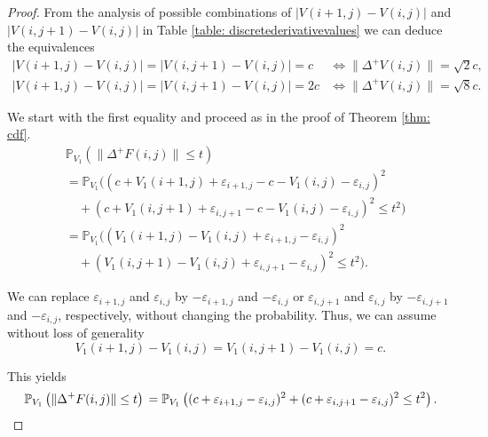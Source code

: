 \documentclass[a4paper,12pt]{article}
\newcommand{\abs}[1]{\lvert#1\rvert}
\newcommand{\norm}[1]{\lVert#1\rVert}
\theoremstyle{plain}
\theoremstyle{definition}
\numberwithin{equation}{section}
\begin{document}
\begin{proof}
	From the analysis of possible combinations of $\abs{V(i + 1, j) - V(i, j)}$ and $\abs{V(i, j + 1) - V(i, j)}$ in Table \ref{table: discretederivativevalues} we can deduce the equivalences
	\begin{align*}
		\abs{V(i + 1, j) - V(i, j)} = \abs{V(i, j + 1) - V(i, j)} = c &\Leftrightarrow \norm{\Delta^+ V(i, j)} = \sqrt{2} c, \\
		\abs{V(i + 1, j) - V(i, j)} = \abs{V(i, j + 1) - V(i, j)} = 2 c &\Leftrightarrow \norm{\Delta^+ V(i, j)} = \sqrt{8} c.
	\end{align*}
	
	We start with the first equality and proceed as in the proof of Theorem \ref{thm: cdf}.
	\begin{align*}
		&\mathbb{P}_{V_1}\left( \norm{\Delta^+ F(i, j)} \leq t \right) \\
		&= \mathbb{P}_{V_1}\big( (c + V_1(i + 1, j) + \varepsilon_{i + 1, j} - c - V_1(i, j) - \varepsilon_{i, j})^2 \\
		&\quad + (c + V_1(i, j + 1) + \varepsilon_{i, j + 1} - c - V_1(i, j) - \varepsilon_{i, j})^2 \leq t^2 \big) \\
		&= \mathbb{P}_{V_1}\big( (V_1(i + 1, j) - V_1(i, j) + \varepsilon_{i + 1, j} - \varepsilon_{i, j})^2 \\
		&\quad + (V_1(i, j + 1) - V_1(i, j) + \varepsilon_{i, j + 1} - \varepsilon_{i, j})^2 \leq t^2 \big).
	\end{align*}
	
	We can replace $\varepsilon_{i + 1, j}$ and $\varepsilon_{i, j}$ by $- \varepsilon_{i + 1, j}$ and $- \varepsilon_{i, j}$ or $\varepsilon_{i, j + 1}$ and $\varepsilon_{i, j}$ by $- \varepsilon_{i, j + 1}$ and $- \varepsilon_{i, j}$, respectively, without changing the probability. Thus, we can assume without loss of generality
	\begin{equation*}
		V_1(i + 1, j) - V_1(i, j) = V_1(i, j + 1) - V_1(i, j) = c.
	\end{equation*}
	
	This yields
	\begin{equation*}
		\mathbb{P}_{V_1}\left( \norm{\Delta^+ F(i, j)} \leq t \right) \\
		= \mathbb{P}_{V_1}\left( (c + \varepsilon_{i + 1, j} - \varepsilon_{i, j})^2 + (c + \varepsilon_{i, j + 1} - \varepsilon_{i, j})^2 \leq t^2 \right).
	\end{equation*}
	

\end{proof}
\end{document}
